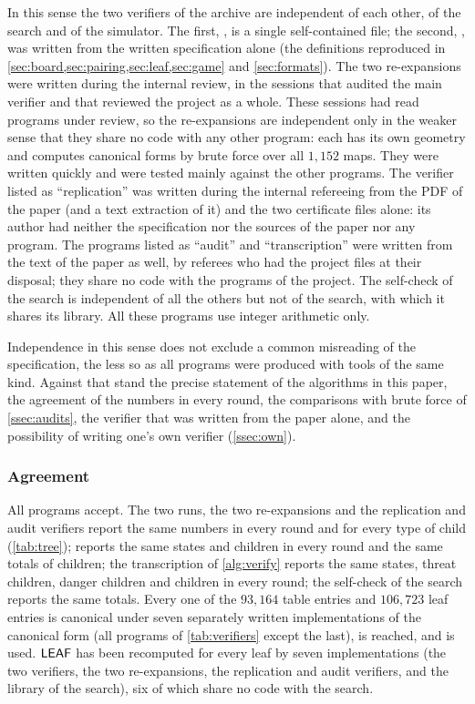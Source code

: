 In this sense the two verifiers of the archive are independent of each other, of the search and of the
simulator. The first, , is a single self-contained file; the second,
, was written
from the written specification alone (the definitions reproduced in
\cref{sec:board,sec:pairing,sec:leaf,sec:game} and \cref{sec:formats}). The two re-expansions were written
during the internal review, in the sessions that audited the main verifier and that reviewed the
project as a whole. These sessions had read programs under review, so the re-expansions are independent
only in the weaker sense that they share no code with any other program: each has its own geometry and
computes canonical forms by brute force over all $1{,}152$ maps. They were written quickly and were
tested mainly against the other programs. The verifier listed as ``replication'' was written during the
internal refereeing from the PDF of the paper (and a text extraction of it) and the two certificate
files alone: its author had neither the specification nor the sources of the paper nor any program. The programs listed as ``audit'' and ``transcription'' were written from the text of
the paper as well, by referees who had the project files at their disposal; they share no code with
the programs of the project. The self-check of the search is independent of all the others but
not of the search, with which it shares its library. All these programs use integer arithmetic only.

Independence in this sense does not exclude a common misreading of the specification, the less so as all
programs were produced with tools of the same kind. Against that stand the precise statement of the
algorithms in this paper, the agreement of the numbers in every round, the comparisons with brute force
of \cref{ssec:audits}, the verifier that was written from the paper alone, and the possibility of writing
one's own verifier (\cref{ssec:own}).

\subsubsection*{Agreement}
All programs accept. The two  runs, the two re-expansions and the replication and audit
verifiers report the same numbers in every round and for every type of child (\cref{tab:tree});
 reports the same states and \VOID{} children in every round and the same totals of
children; the transcription of \cref{alg:verify} reports the same states, threat children, danger
children and \VOID{} children in every round; the self-check of the search reports the same totals. Every
one of the $93{,}164$ table entries and $106{,}723$ leaf entries is canonical under seven separately
written implementations of the canonical form (all programs of \cref{tab:verifiers} except the last), is
reached, and is used. $\mathsf{LEAF}$ has been recomputed for every leaf by seven implementations (the two
verifiers, the two re-expansions, the replication and audit verifiers, and the library of the search),
six of which share no code with the search.

